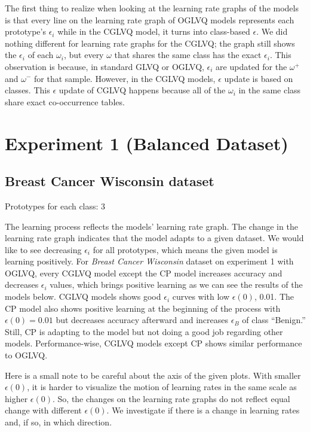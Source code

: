 The first thing to realize when looking at the learning rate graphs of the models is that every line on the learning rate graph of OGLVQ models represents each prototype’s $\epsilon_{i}$ while in the CGLVQ model, it turns into class-based $\epsilon$. We did nothing different for learning rate graphs for the CGLVQ; the graph still shows the $\epsilon_{i}$ of each $\omega_{i}$, but every $\omega$ that shares the same class has the exact $\epsilon_{i}$. This observation is because, in standard GLVQ or OGLVQ, $\epsilon_{i}$ are updated for the $\omega^{+}$ and $\omega^{-}$ for that sample. However, in the CGLVQ models, $\epsilon$ update is based on classes. This $\epsilon$ update of CGLVQ happens because all of the $\omega_{i}$ in the same class share exact co-occurrence tables.

\section{Experiment 1 (Balanced Dataset)}

\subsection{Breast Cancer Wisconsin dataset}

Prototypes for each class: 3
\vspace{5pt}


The learning process reflects the models’ learning rate graph. The change in the learning rate graph indicates that the model adapts to a given dataset. We would like to see decreasing $\epsilon_{i}$ for all prototypes, which means the given model is learning positively. For \textit{Breast Cancer Wisconsin} dataset on experiment 1 with OGLVQ, every CGLVQ model except the CP model increases accuracy and decreases $\epsilon_{i}$ values, which brings positive learning as we can see the results of the models below. CGLVQ models shows good $\epsilon_{i}$ curves with low $\epsilon(0)$, 0.01. The CP model also shows positive learning at the beginning of the process with $\epsilon(0) = 0.01$ but decreases accuracy afterward and increases $\epsilon_{B}$ of class “Benign.” Still, CP is adapting to the model but not doing a good job regarding other models. Performance-wise, CGLVQ models except CP shows similar performance to OGLVQ.

Here is a small note to be careful about the axis of the given plots. With smaller $\epsilon(0)$, it is harder to visualize the motion of learning rates in the same scale as higher $\epsilon(0)$. So, the changes on the learning rate graphs do not reflect equal change with different ${\epsilon(0)}$. We investigate if there is a change in learning rates and, if so, in which direction.

